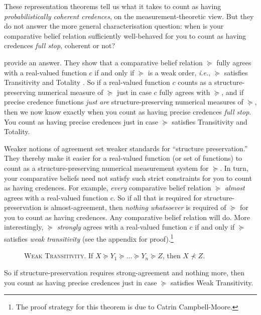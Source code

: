 These representation theorems tell us what it takes to count as having \textit{probabilistically coherent credences}, on the measurement-theoretic view. But they do not answer the more general characterisation question: when is your comparative belief relation sufficiently well-behaved for you to count as having credences \textit{full stop}, coherent or not?




\citet{Krantz1971} provide an answer. They show that a comparative belief relation $\succeq$ fully agrees with a real-valued function $c$ if and only if $\succeq$ is a weak order, \textit{i.e.}, $\succeq$ satisfies Transitivity and Totality \citep[p. 15, Theorem 1]{Krantz1971}. So if a real-valued function $c$ counts as a structure-preserving numerical measure of $\succeq$ just in case $c$ fully agrees with $\succeq$, and if precise credence functions \textit{just are} structure-preserving numerical measures of $\succeq$, then we now know exactly when you count as having precise credences \textit{full stop}. You count as having precise credences just in case $\succeq$ satisfies Transitivity and Totality.

Weaker notions of agreement set weaker standards for ``structure preservation.'' They thereby make it easier for a real-valued function (or set of functions) to count as a structure-preserving numerical measurement system for $\succeq$. In turn, your comparative beliefs need not satisfy such strict constraints for you to count as having credences. For example, \textit{every} comparative belief relation $\succeq$ \textit{almost} agrees with a real-valued function $c$. So if all that is required for structure-preservation is almost-agreement, then \textit{nothing whatsoever} is required of $\succeq$ for you to count as having credences. Any comparative belief relation will do. More interestingly, $\succeq$ \textit{strongly} agrees with a real-valued function $c$ if and only if $\succeq$ satisfies \textit{weak transitivity} (see the appendix for proof).\footnote{The proof strategy for this theorem is due to Catrin Campbell-Moore.}
\begin{description}
\item[]\textsc{Weak Transitivity}. If $X\succeq Y_1\succeq\hdots\succeq Y_n\succeq Z$, then $X\not\prec Z$.
\end{description}
So if structure-preservation requires strong-agreement and nothing more, then you count as having precise credences just in case $\succeq$ satisfies Weak Transitivity.

